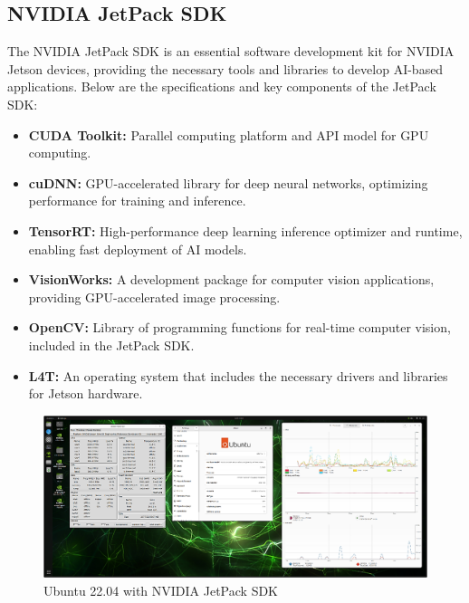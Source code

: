 \subsection{\fontsize{14}{16} NVIDIA JetPack SDK}
{
	\fontsize{12}{14}
	The NVIDIA JetPack SDK is an essential software development kit for NVIDIA Jetson devices, providing the necessary tools and libraries to develop AI-based applications. Below
	are the specifications and key components of the JetPack SDK:
	\begin{itemize}
		\item \textbf{CUDA Toolkit:} Parallel computing platform and API model for GPU computing.
		\item \textbf{cuDNN:} GPU-accelerated library for deep neural networks, optimizing performance for training and inference.
		\item \textbf{TensorRT:} High-performance deep learning inference optimizer and runtime, enabling fast deployment of AI models.
		\item \textbf{VisionWorks:} A development package for computer vision applications, providing GPU-accelerated image processing.
		\item \textbf{OpenCV:} Library of programming functions for real-time computer vision, included in the JetPack SDK.
		\item \textbf{L4T:} An operating system that includes the necessary drivers and libraries for Jetson hardware.
	\end{itemize}
	
	\begin{figure}[H]
		\centering
		\includegraphics{images/Content/Ubuntu}
		\caption{Ubuntu 22.04 with NVIDIA JetPack SDK}
		\label{fig:ubuntu}
	\end{figure}
}

